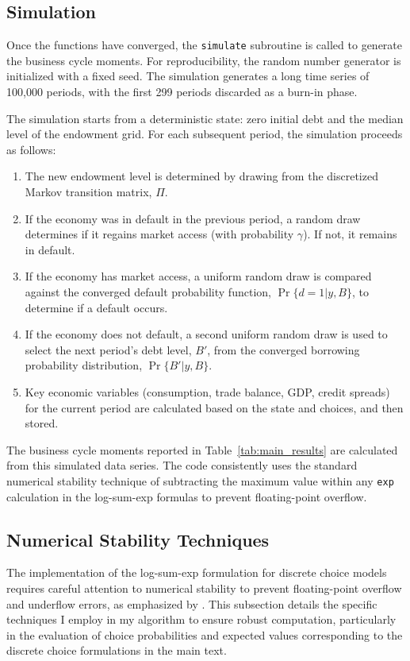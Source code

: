 \documentclass[12pt]{article}
\theoremstyle{plain}
\begin{document}
\subsection{Simulation}
Once the functions have converged, the \texttt{simulate} subroutine is called
to generate the business cycle moments. For reproducibility, the random number
generator is initialized with a fixed seed. The simulation generates a long
time series of 100,000 periods, with the first 299 periods discarded as a
burn-in phase.

The simulation starts from a deterministic state: zero initial debt and the
median level of the endowment grid. For each subsequent period, the simulation
proceeds as follows:
\begin{enumerate}
	\item The new endowment level is determined by drawing from the discretized Markov
	      transition matrix, $\Pi$.
	\item If the economy was in default in the previous period, a random draw determines
	      if it regains market access (with probability $\gamma$). If not, it remains in
	      default.
	\item If the economy has market access, a uniform random draw is compared against the
	      converged default probability function, $\Pr\{d=1|y,B\}$, to determine if a
	      default occurs.
	\item If the economy does not default, a second uniform random draw is used to select
	      the next period's debt level, $B'$, from the converged borrowing probability
	      distribution, $\Pr\{B'|y,B\}$.
	\item Key economic variables (consumption, trade balance, GDP, credit spreads) for
	      the current period are calculated based on the state and choices, and then
	      stored.
\end{enumerate}
The business cycle moments reported in Table~\ref{tab:main_results} are calculated from this simulated data series. The code consistently uses the standard numerical stability technique of
subtracting the maximum value within any \texttt{exp} calculation in the
log-sum-exp formulas to prevent floating-point overflow.

\subsection{Numerical Stability Techniques}\label{app:numerical_stability}

The implementation of the log-sum-exp formulation for discrete choice models
requires careful attention to numerical stability to prevent floating-point
overflow and underflow errors, as emphasized by \citet{MIHALACHEOREEF2024}.
This subsection details the specific techniques I employ in my algorithm to
ensure robust computation, particularly in the evaluation of choice
probabilities and expected values corresponding to the discrete choice
formulations in the main text.
\end{document}
